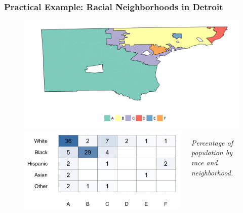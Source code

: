 \documentclass{beamer}
\begin{document}
	\begin{frame}[t]\frametitle{Practical Example: Racial Neighborhoods in Detroit}
	    \begin{figure}
	    	\centering
	    	\includegraphics[width=.8\textwidth]{figs/example_cluster_map.png}
		\begin{columns}
			\begin{column}{0.6\textwidth}
				\includegraphics[width=\textwidth]{figs/example_clusters_detailed.png}
			\end{column}
			\begin{column}{0.3\textwidth}  
			     \emph{Percentage of population by race and neighborhood.}
			\end{column}
		\end{columns}
	    \end{figure}
	\end{frame}
	\iflong
\end{document}

